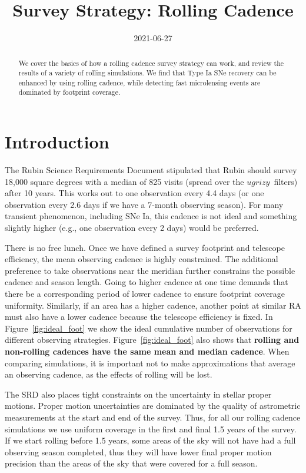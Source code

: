 \documentclass[modern]{aastex62}
\begin{document}

\date{2021-06-27}
\title{Survey Strategy: Rolling Cadence}

\begin{abstract}
We cover the basics of how a rolling cadence survey strategy can work, and review the results of a variety of rolling simulations. We find that Type Ia SNe recovery can be enhanced by using rolling cadence, while detecting fast microlensing events are dominated by footprint coverage.
\end{abstract}

\section{Introduction}

The Rubin Science Requirements Document \citep[SRD;][]{LPM-17} stipulated that Rubin should survey 18,000 square degrees with a median of 825 visits (spread over the $ugrizy$\ filters) after 10 years. This works out to one observation every 4.4 days (or one observation every 2.6 days if we have a 7-month observing season). For many transient phenomenon, including SNe Ia, this cadence is not ideal and something slightly higher (e.g., one observation every 2 days) would be preferred.

There is no free lunch. Once we have defined a survey footprint and telescope efficiency, the mean observing cadence is highly constrained. The additional preference to take observations near the meridian further constrains the possible cadence and season length. Going to higher cadence at one time demands that there be a corresponding period of lower cadence to ensure footprint coverage uniformity. Similarly, if an area has a higher cadence, another point at similar RA must also have a lower cadence because the telescope efficiency is fixed.  In Figure~\ref{fig:ideal_foot} we show the ideal cumulative number of observations for different observing strategies. Figure~\ref{fig:ideal_foot} also shows that {\bf{rolling and non-rolling cadences have the same mean and median cadence}}. When comparing simulations, it is important not to make approximations that average an observing cadence, as the effects of rolling will be lost.

The SRD also places tight constraints on the uncertainty in stellar proper motions. Proper motion uncertainties are dominated by the quality of astrometric measurements at the start and end of the survey. Thus, for all our rolling cadence simulations we use uniform coverage in the first and final 1.5 years of the survey. If we start rolling before 1.5 years, some areas of the sky will not have had a full observing season completed, thus they will have lower final proper motion precision than the areas of the sky that were covered for a full season.
\end{document}
